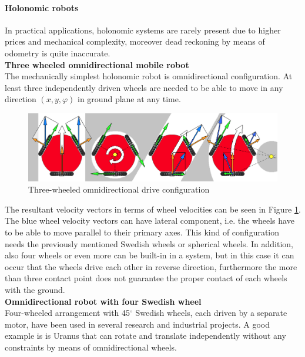 \documentclass[12pt,english]{article}
\begin{document}
\paragraph{Holonomic robots}
In practical applications, holonomic systems are rarely present due to higher prices and mechanical complexity, moreover dead reckoning by means of odometry is quite inaccurate. \\[10pt]
\noindent \textbf{Three wheeled omnidirectional mobile robot} \\
The mechanically simplest holonomic robot is omnidirectional configuration. At least three independently driven wheels are needed to be able to move in any direction $(x,y,\varphi)$ in ground plane at any time.
\begin{figure}[htb!]
	\centering
	\includegraphics[width=15cm]{figures/omniconfig.png}
	\caption{Three-wheeled omnidirectional drive configuration}
	\label{omniconfig}
\end{figure}
The resultant velocity vectors in terms of wheel velocities can be seen in Figure \ref{omniconfig}. The blue wheel velocity vectors can have lateral component, i.e. the wheels have to be able to move parallel to their primary axes. This kind of configuration needs the previously mentioned Swedish wheels or spherical wheels. 
In addition, also four wheels or even more can be built-in in a system, but in this case it can occur that the wheels drive each other in reverse direction, furthermore the more than three contact point does not guarantee the proper contact of each wheels with the ground.\\[10pt]
\noindent \textbf{Omnidirectional robot with four Swedish wheel} \\
Four-wheeled arrangement with 45$^{\circ}$ Swedish wheels, each driven by a separate motor, have been used in several research and industrial projects. A good example is is Uranus that can rotate and translate independently without any constraints by means of omnidirectional wheels.
\end{document}
